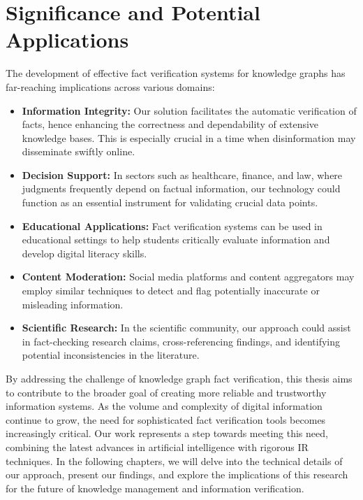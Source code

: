 \section{Significance and Potential Applications}\label{sec:significance}
The development of effective fact verification systems for knowledge graphs has far-reaching implications across various domains:
\begin{itemize}
    \item \textbf{Information Integrity:} Our solution facilitates the automatic verification of facts, hence enhancing the correctness and dependability of extensive knowledge bases. This is especially crucial in a time when disinformation may disseminate swiftly online.
    \item \textbf{Decision Support:} In sectors such as healthcare, finance, and law, where judgments frequently depend on factual information, our technology could function as an essential instrument for validating crucial data points.
    \item \textbf{Educational Applications:} Fact verification systems can be used in educational settings to help students critically evaluate information and develop digital literacy skills.
    \item \textbf{Content Moderation:} Social media platforms and content aggregators may employ similar techniques to detect and flag potentially inaccurate or misleading information.
    \item \textbf{Scientific Research:} In the scientific community, our approach could assist in fact-checking research claims, cross-referencing findings, and identifying potential inconsistencies in the literature.
\end{itemize}

By addressing the challenge of knowledge graph fact verification, this thesis aims to contribute to the broader goal of creating more reliable and trustworthy information systems.
As the volume and complexity of digital information continue to grow, the need for sophisticated fact verification tools becomes increasingly critical.
Our work represents a step towards meeting this need, combining the latest advances in artificial intelligence with rigorous \ac{IR} techniques.
In the following chapters, we will delve into the technical details of our approach, present our findings, and explore the implications of this research for the future of knowledge management and information verification.